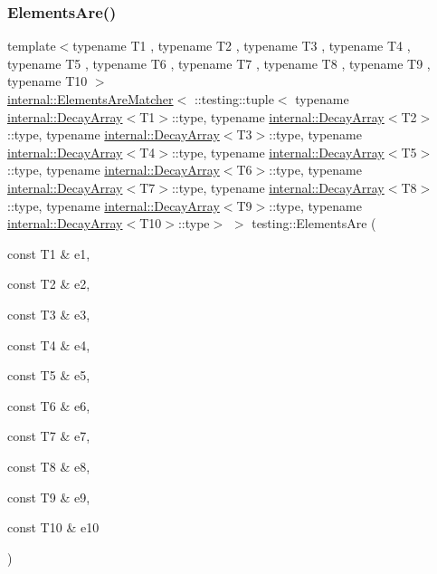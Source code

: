 \subsubsection{\texorpdfstring{Elements\+Are()}{ElementsAre()}\hspace{0.1cm}{\footnotesize\ttfamily [11/11]}}
{\footnotesize\ttfamily template$<$typename T1 , typename T2 , typename T3 , typename T4 , typename T5 , typename T6 , typename T7 , typename T8 , typename T9 , typename T10 $>$ \\
\hyperlink{classtesting_1_1internal_1_1ElementsAreMatcher}{internal\+::\+Elements\+Are\+Matcher}$<$ \+::testing\+::tuple$<$ typename \hyperlink{structtesting_1_1internal_1_1DecayArray}{internal\+::\+Decay\+Array}$<$T1$>$\+::type, typename \hyperlink{structtesting_1_1internal_1_1DecayArray}{internal\+::\+Decay\+Array}$<$T2$>$\+::type, typename \hyperlink{structtesting_1_1internal_1_1DecayArray}{internal\+::\+Decay\+Array}$<$T3$>$\+::type, typename \hyperlink{structtesting_1_1internal_1_1DecayArray}{internal\+::\+Decay\+Array}$<$T4$>$\+::type, typename \hyperlink{structtesting_1_1internal_1_1DecayArray}{internal\+::\+Decay\+Array}$<$T5$>$\+::type, typename \hyperlink{structtesting_1_1internal_1_1DecayArray}{internal\+::\+Decay\+Array}$<$T6$>$\+::type, typename \hyperlink{structtesting_1_1internal_1_1DecayArray}{internal\+::\+Decay\+Array}$<$T7$>$\+::type, typename \hyperlink{structtesting_1_1internal_1_1DecayArray}{internal\+::\+Decay\+Array}$<$T8$>$\+::type, typename \hyperlink{structtesting_1_1internal_1_1DecayArray}{internal\+::\+Decay\+Array}$<$T9$>$\+::type, typename \hyperlink{structtesting_1_1internal_1_1DecayArray}{internal\+::\+Decay\+Array}$<$T10$>$\+::type$>$ $>$ testing\+::\+Elements\+Are (\begin{DoxyParamCaption}\item[{const T1 \&}]{e1,  }\item[{const T2 \&}]{e2,  }\item[{const T3 \&}]{e3,  }\item[{const T4 \&}]{e4,  }\item[{const T5 \&}]{e5,  }\item[{const T6 \&}]{e6,  }\item[{const T7 \&}]{e7,  }\item[{const T8 \&}]{e8,  }\item[{const T9 \&}]{e9,  }\item[{const T10 \&}]{e10 }\end{DoxyParamCaption})\hspace{0.3cm}{\ttfamily [inline]}}



